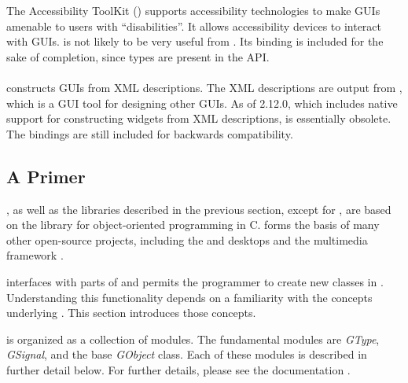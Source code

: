 \documentclass[article]{jss}
\begin{document}
The Accessibility ToolKit () supports accessibility
technologies to make GUIs amenable to users with ``disabilities''.  It
allows accessibility devices to interact with 
GUIs.  is not likely to be very useful from . Its
binding is included for the sake of completion, since  types
are present in the  API.

\paragraph[Libglade]{}

 constructs  GUIs from XML descriptions.
The XML descriptions are output from
, which is a GUI tool for designing other GUIs. 
As of  2.12.0, which includes native support for
constructing widgets from XML descriptions,  is
essentially obsolete. The bindings are still included for backwards
compatibility.

\subsection[A GObject Primer]{A 
Primer}\label{sec:primer}

, as well as the libraries described in the previous
section,
except for , are based on the  library for 
object-oriented programming in C.  forms the basis of
many other 
open-source projects, including the  \citep{GTK} and
\citep{xfce} desktops and the  multimedia framework
\citep{gstreamer}.

 interfaces with parts of  and permits the
programmer to create new  classes in .
Understanding 
this functionality depends on a familiarity with the concepts
underlying 
. This section introduces those concepts.

 is organized as a collection of modules. The fundamental
modules are \emph{GType}, \emph{GSignal}, and the base
\emph{GObject} class. Each of these modules is described in further
detail below. 
For further details, please see the  documentation
\citep{gobject}.
\end{document}
